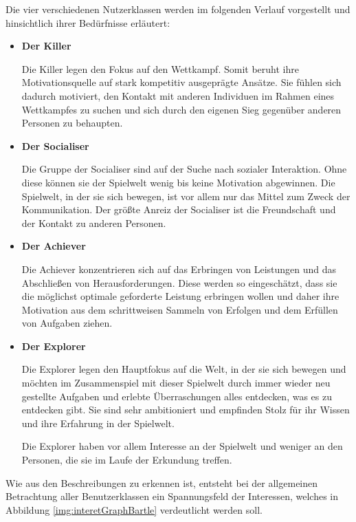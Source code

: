 \documentclass[bibliography=totoc,listof=totoc,BCOR=5mm,DIV=12,oneside]{scrbook}
\begin{document}
\par Die vier verschiedenen Nutzerklassen werden im folgenden Verlauf vorgestellt und hinsichtlich ihrer Bedürfnisse erläutert:
\begin{itemize}
\item \textbf{Der Killer}
\par Die Killer legen den Fokus auf den Wettkampf. Somit beruht ihre Motivationsquelle auf stark kompetitiv ausgeprägte Ansätze. Sie fühlen sich dadurch motiviert, den Kontakt mit anderen Individuen im Rahmen eines Wettkampfes zu suchen und sich durch den eigenen Sieg gegenüber anderen Personen zu behaupten.

\item \textbf{Der Socialiser}
\par Die Gruppe der Socialiser sind auf der Suche nach sozialer Interaktion. Ohne diese können sie der Spielwelt wenig bis keine Motivation abgewinnen. Die Spielwelt, in der sie sich bewegen, ist vor allem nur das Mittel zum Zweck der Kommunikation. Der größte Anreiz der Socialiser ist die Freundschaft und der Kontakt zu anderen Personen.

\newpage
\item \textbf{Der Achiever}
\par Die Achiever konzentrieren sich auf das Erbringen von Leistungen und das Abschließen von Herausforderungen. Diese werden so eingeschätzt, dass sie die möglichst optimale geforderte Leistung erbringen wollen und daher ihre Motivation aus dem schrittweisen Sammeln von Erfolgen und dem Erfüllen von Aufgaben ziehen.

\item \textbf{Der Explorer}
\par Die Explorer legen den Hauptfokus auf die Welt, in der sie sich bewegen und möchten im Zusammenspiel mit dieser Spielwelt durch immer wieder neu gestellte Aufgaben und erlebte Überraschungen alles entdecken, was es zu entdecken gibt. Sie sind sehr ambitioniert und empfinden Stolz für ihr Wissen und ihre Erfahrung in der Spielwelt. 
\par Die Explorer haben vor allem Interesse an der Spielwelt und weniger an den Personen, die sie im Laufe der Erkundung treffen.
\end{itemize}

\par Wie aus den Beschreibungen zu erkennen ist, entsteht bei der allgemeinen Betrachtung aller Benutzerklassen ein Spannungsfeld der Interessen, welches in Abbildung \ref{img:interetGraphBartle} verdeutlicht werden soll.
\end{document}
